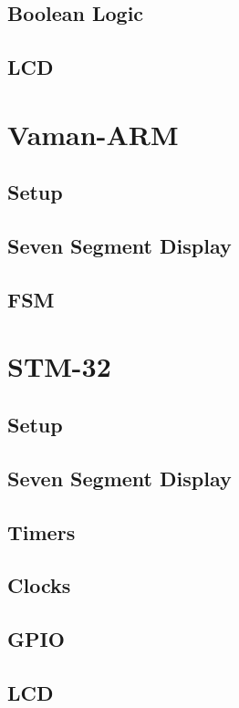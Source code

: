\documentclass[11pt]{book}
\begin{document}
\section{Boolean Logic}

\section{LCD}

\chapter{Vaman-ARM}
\section{Setup}

\section{Seven Segment Display}

\section{FSM}

%
\chapter{STM-32}
\section{Setup}

\section{Seven Segment Display}

\section{Timers}

\section{Clocks}

\section{GPIO}

\section{LCD}

\end{document}
